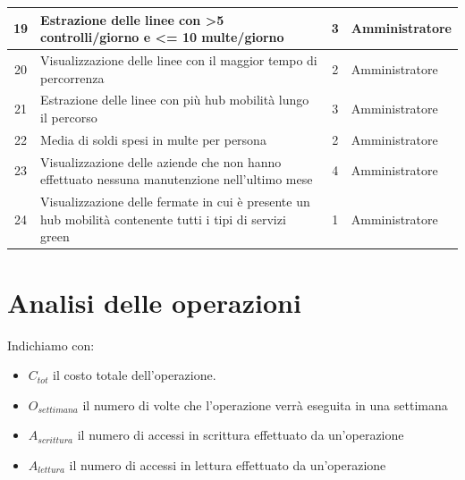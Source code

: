 \documentclass[12pt,a4paper]{report}
\begin{document}
\begin{longtable}{|c|p{7.5cm}|c|l|}
\hline
19 & Estrazione delle linee con \textgreater 5 controlli/giorno e \textless = 10 multe/giorno & 3 & Amministratore     \\
\hline
20 & Visualizzazione delle linee con il maggior tempo di percorrenza & 2 & Amministratore \\
\hline
21 & Estrazione delle linee con più hub mobilità lungo il percorso & 3 & Amministratore \\
\hline
22 & Media di soldi spesi in multe per persona & 2 & Amministratore \\
\hline
23 & Visualizzazione delle aziende che non hanno effettuato nessuna manutenzione nell'ultimo mese & 4 & Amministratore \\
\hline
24 & Visualizzazione delle fermate in cui è presente un hub mobilità contenente tutti i tipi di servizi green & 1 & Amministratore \\
\hline
\end{longtable}

\section{Analisi delle operazioni}
Indichiamo con:
\begin{itemize}
	\item ${C_{tot}}$ il costo totale dell'operazione.
	\item ${O_{settimana}}$ il numero di volte che l'operazione verrà eseguita in una settimana
	\item ${A_{scrittura}}$ il numero di accessi in scrittura effettuato da un'operazione
	\item ${A_{lettura}}$ il numero di accessi in lettura effettuato da un'operazione
\end{itemize}
\end{document}
